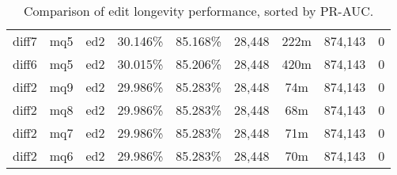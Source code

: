 \begin{sidewaystable}[!ph]
\begin{center}
\begin{tabular}{|c|c|c||c|c||c|c|c|c|}
diff7 & mq5 & ed2 & 30.146\% & 85.168\% & 28,448 & 222m & 874,143 & 0 \\
diff6 & mq5 & ed2 & 30.015\% & 85.206\% & 28,448 & 420m & 874,143 & 0 \\
diff2 & mq9 & ed2 & 29.986\% & 85.283\% & 28,448 & 74m & 874,143 & 0 \\
diff2 & mq8 & ed2 & 29.986\% & 85.283\% & 28,448 & 68m & 874,143 & 0 \\
diff2 & mq7 & ed2 & 29.986\% & 85.283\% & 28,448 & 71m & 874,143 & 0 \\
diff2 & mq6 & ed2 & 29.986\% & 85.283\% & 28,448 & 70m & 874,143 & 0 \\
\hline
\end{tabular}
\end{center}
\caption{Comparison of edit longevity performance,
    sorted by PR-AUC.}
\label{tab:editshoutK}
\end{sidewaystable}
\clearpage
